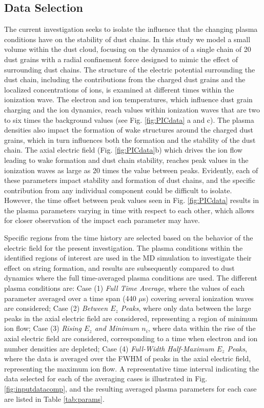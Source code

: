 \documentclass[aip,amsmath,amssymb,graphicx,floatfix,reprint]{revtex4-1}
\begin{document}
\subsection{Data Selection}
\label{data selection}
The current investigation seeks to isolate the influence that the changing plasma conditions have on the stability of dust chains. In this study we model a small volume within the dust cloud, focusing on the dynamics of a single chain of 20 dust grains with a radial confinement force designed to mimic the effect of surrounding dust chains. The structure of the electric potential surrounding the dust chain, including the contributions from the charged dust grains and the localized concentrations of ions, is examined at different times within the ionization wave.  The electron and ion temperatures, which influence dust grain charging and the ion dynamics, reach values within ionization waves that are two to six times the background values (see Fig. \ref{fig:PICdata} a and c).  The plasma densities also impact the formation of wake structures around the charged dust grains, which in turn influences both the formation and the stability of the dust chain.  The axial electric field (Fig. \ref{fig:PICdata}b) which drives the ion flow leading to wake formation and dust chain stability, reaches peak values in the ionization waves as large as 20 times the value between peaks.  Evidently, each of these parameters impact stability and formation of dust chains, and the specific contribution from any individual component could be difficult to isolate.  However, the time offset between peak values seen in Fig. \ref{fig:PICdata} results in the plasma parameters varying in time with respect to each other, which allows for closer observation of the impact each parameter may have.



Specific regions from the time history are selected based on the behavior of the electric field for the present investigation.  The plasma conditions within the identified regions of interest are used in the MD simulation to investigate their effect on string formation, and results are subsequently compared to dust dynamics where the full time-averaged plasma conditions are used.  The different plasma conditions are: Case (1) \emph{Full Time Average}, where the values of each parameter averaged over a time span (440 $\mu$s) covering several ionization waves are considered; Case (2) \emph{Between $E_z$ Peaks}, where only data between the large peaks in the axial electric field are considered, representing a region of minimum ion flow; Case (3) \emph{Rising $E_z$ and Minimum $n_i$}, where data within the rise of the axial electric field are considered, corresponding to a time when electron and ion number densities are depleted; Case (4) \emph{Full-Width Half-Maximum $E_z$ Peaks}, where the data is averaged over the FWHM of peaks in the axial electric field, representing the maximum ion flow.  A representative time interval indicating the data selected for each of the averaging cases is illustrated in Fig. \ref{fig:inputdatacomp}, and the resulting averaged plasma parameters for each case are listed in Table \ref{tab:params}.
\end{document}
